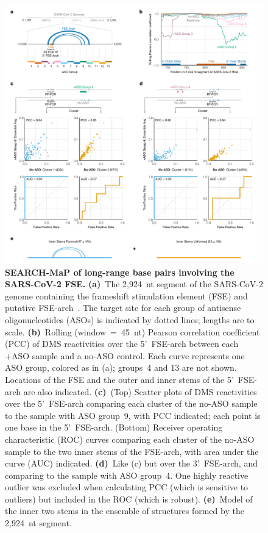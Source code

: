 \documentclass[main.tex]{subfiles}
\begin{document}
\begin{figure}[H]
	\includegraphics[width=\textwidth]{../MainFigures/sars2-tile/sars2-tile.pdf}
	\caption{\textbf{SEARCH-MaP of long-range base pairs involving the SARS-CoV-2 FSE.} \textbf{(a)}~The 2,924~nt segment of the SARS-CoV-2 genome containing the frameshift stimulation element (FSE) and putative FSE-arch~\cite{Ziv2020}. The target site for each group of antisense oligonucleotides (ASOs) is indicated by dotted lines; lengths are to scale. \textbf{(b)}~Rolling (window~=~45~nt) Pearson correlation coefficient (PCC) of DMS reactivities over the 5'~FSE-arch between each +ASO sample and a no-ASO control. Each curve represents one ASO group, colored as in (a); groups~4 and 13 are not shown. Locations of the FSE and the outer and inner stems of the 5'~FSE-arch are also indicated. \textbf{(c)}~(Top) Scatter plots of DMS reactivities over the 5'~FSE-arch comparing each cluster of the no-ASO sample to the sample with ASO group~9, with PCC indicated; each point is one base in the 5'~FSE-arch. (Bottom) Receiver operating characteristic (ROC) curves comparing each cluster of the no-ASO sample to the two inner stems of the FSE-arch, with area under the curve (AUC) indicated. \textbf{(d)}~Like (c) but over the 3'~FSE-arch, and comparing to the sample with ASO group~4. One highly reactive outlier was excluded when calculating PCC (which is sensitive to outliers) but included in the ROC (which is robust). \textbf{(e)}~Model of the inner two stems in the ensemble of structures formed by the 2,924~nt segment.}
	\label{tiles}
\end{figure}
\end{document}
